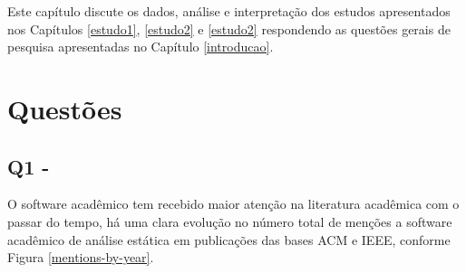 \label{discussao}

Este capítulo discute os 
dados, análise e interpretação dos estudos apresentados nos Capítulos
\ref{estudo1}, \ref{estudo2} e \ref{estudo2}
respondendo as questões gerais de pesquisa apresentadas no Capítulo
\ref{introducao}.


\section{Questões} 

\subsection{Q1 - \QuestaoUm} %

O software acadêmico tem recebido maior atenção na literatura acadêmica com o
passar do tempo, há uma clara evolução no número total de menções a software
acadêmico de análise estática em publicações das bases ACM e IEEE, conforme
Figura \ref{mentions-by-year}.

